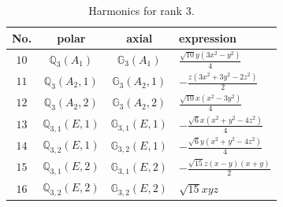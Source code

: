 \documentclass[fleqn,8pt,landscape]{jsarticle}
\begin{document}
\begin{table}[ht!]
\begin{center}
\caption{Harmonics for rank 3.}
\renewcommand{\arraystretch}{1.3}
\begin{tabular}{cccl} \hline \hline
No. & polar & axial & expression \\ \hline
$ 10 $ & $ \mathbb{Q}_{3}(A_{1}) $ & $ \mathbb{G}_{3}(A_{1}) $ & $ \frac{\sqrt{10} y \left(3 x^{2} - y^{2}\right)}{4} $ \\
$ 11 $ & $ \mathbb{Q}_{3}(A_{2},1) $ & $ \mathbb{G}_{3}(A_{2},1) $ & $ - \frac{z \left(3 x^{2} + 3 y^{2} - 2 z^{2}\right)}{2} $ \\
$ 12 $ & $ \mathbb{Q}_{3}(A_{2},2) $ & $ \mathbb{G}_{3}(A_{2},2) $ & $ \frac{\sqrt{10} x \left(x^{2} - 3 y^{2}\right)}{4} $ \\
$ 13 $ & $ \mathbb{Q}_{3,1}(E,1) $ & $ \mathbb{G}_{3,1}(E,1) $ & $ - \frac{\sqrt{6} x \left(x^{2} + y^{2} - 4 z^{2}\right)}{4} $ \\
$ 14 $ & $ \mathbb{Q}_{3,2}(E,1) $ & $ \mathbb{G}_{3,2}(E,1) $ & $ - \frac{\sqrt{6} y \left(x^{2} + y^{2} - 4 z^{2}\right)}{4} $ \\
$ 15 $ & $ \mathbb{Q}_{3,1}(E,2) $ & $ \mathbb{G}_{3,1}(E,2) $ & $ - \frac{\sqrt{15} z \left(x - y\right) \left(x + y\right)}{2} $ \\
$ 16 $ & $ \mathbb{Q}_{3,2}(E,2) $ & $ \mathbb{G}_{3,2}(E,2) $ & $ \sqrt{15} x y z $ \\
 \hline \hline
\end{tabular}
\end{center}
\end{table}
\end{document}
